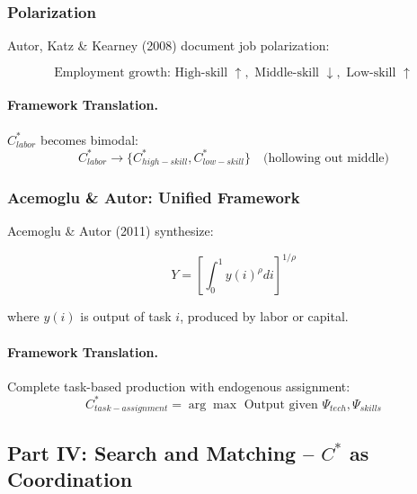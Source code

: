 \subsubsection{Polarization}

Autor, Katz \& Kearney (2008) document job polarization:

\begin{equation}
\boxed{
\text{Employment growth: High-skill } \uparrow, \text{ Middle-skill } \downarrow, \text{ Low-skill } \uparrow
}
\label{eq:polarization}
\end{equation}

\paragraph{Framework Translation.}
$C^*_{labor}$ becomes bimodal:
\begin{equation}
C^*_{labor} \to \{C^*_{high-skill}, C^*_{low-skill}\} \quad \text{(hollowing out middle)}
\end{equation}

\subsubsection{Acemoglu \& Autor: Unified Framework}

Acemoglu \& Autor (2011) synthesize:

\begin{equation}
Y = \left[ \int_0^1 y(i)^\rho di \right]^{1/\rho}
\end{equation}

where $y(i)$ is output of task $i$, produced by labor or capital.

\paragraph{Framework Translation.}
Complete task-based production with endogenous assignment:
\begin{equation}
C^*_{task-assignment} = \arg\max \text{ Output given } \Psi_{tech}, \Psi_{skills}
\end{equation}

\subsection{Part IV: Search and Matching – $C^*$ as Coordination}


